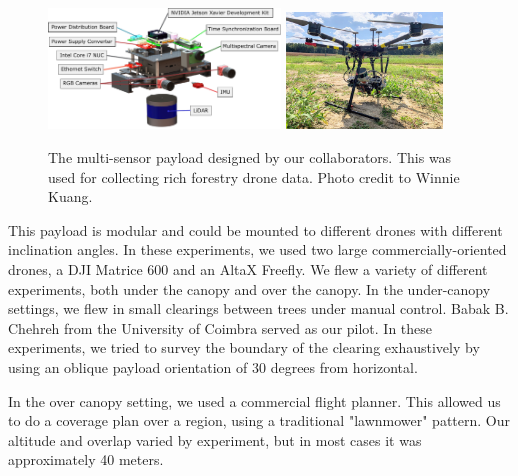 \begin{figure}
    \centering
    \includegraphics[width=0.55\textwidth]{figs/methods/datasets/payload_annotated.pdf}
    \hfill
    \includegraphics[width=0.37\textwidth]{figs/methods/datasets/payload_on_drone.jpeg}
    \caption{The multi-sensor payload designed by our collaborators. This was used for collecting rich forestry drone data. Photo credit to Winnie Kuang.}
    \label{fig:methods:payload}
\end{figure}

This payload is modular and could be mounted to different drones with different inclination angles. In these experiments, we used two large commercially-oriented drones, a DJI Matrice 600 and an AltaX Freefly. We flew a variety of different experiments, both under the canopy and over the canopy. In the under-canopy settings, we flew in small clearings between trees under manual control. Babak B. Chehreh from the University of Coimbra served as our pilot. In these experiments, we tried to survey the boundary of the clearing exhaustively by using an oblique payload orientation of 30 degrees from horizontal.

In the over canopy setting, we used a commercial flight planner. This allowed us to do a coverage plan over a region, using a traditional "lawnmower" pattern. Our altitude and overlap varied by experiment, but in most cases it was approximately 40 meters.


